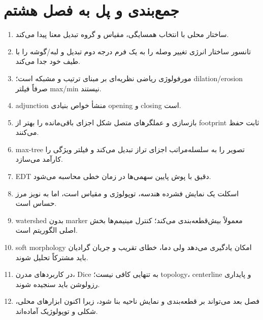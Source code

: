 \documentclass[12pt,openany,oneside]{book}
\begin{document}
\section{جمع‌بندی و پل به فصل هشتم}
\begin{summarybox}
\begin{enumerate}
\item ساختار محلی با انتخاب همسایگی، مقیاس و گروه تبدیل معنا پیدا می‌کند.
\item تانسور ساختار انرژی تغییر وصله را به یک فرم درجه دوم تبدیل و لبه/گوشه را با طیف خود جدا می‌کند.
\item مورفولوژی ریاضی نظریه‌ای بر مبنای ترتیب و مشبکه است؛ dilation/erosion صرفاً فیلتر max/min نیستند.
\item adjunction منشأ خواص بنیادی opening و closing است.
\item بازسازی و عملگرهای متصل شکل اجزای باقی‌مانده را بهتر از footprint ثابت حفظ می‌کنند.
\item max-tree تصویر را به سلسله‌مراتب اجزای تراز تبدیل می‌کند و فیلتر ویژگی را کارآمد می‌سازد.
\item EDT دقیق با پوش پایین سهمی‌ها در زمان خطی محاسبه می‌شود.
\item اسکلت یک نمایش فشرده هندسه، توپولوژی و مقیاس است، اما به نویز مرز حساس است.
\item watershed بدون marker معمولاً بیش‌قطعه‌بندی می‌کند؛ کنترل مینیمم‌ها بخش اصلی الگوریتم است.
\item soft morphology امکان یادگیری می‌دهد ولی دما، خطای تقریب و جریان گرادیان باید مشترکاً تحلیل شوند.
\item در کاربردهای مدرن، Dice به تنهایی کافی نیست؛ topology، centerline و پایداری رزولوشن باید سنجیده شوند.
\item فصل بعد می‌تواند بر قطعه‌بندی و نمایش ناحیه بنا شود، زیرا اکنون ابزارهای محلی، شکلی و توپولوژیک آماده‌اند.
\end{enumerate}
\end{summarybox}

\backmatter
\end{document}
